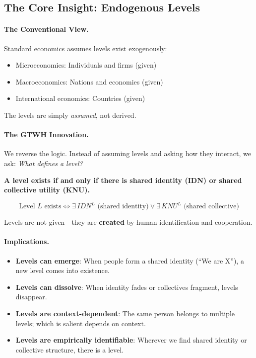 \subsection{The Core Insight: Endogenous Levels}

\paragraph{The Conventional View.}
Standard economics assumes levels exist exogenously:
\begin{itemize}
\item Microeconomics: Individuals and firms (given)
\item Macroeconomics: Nations and economies (given)
\item International economics: Countries (given)
\end{itemize}

The levels are simply \textit{assumed}, not derived.

\paragraph{The GTWH Innovation.}
We reverse the logic. Instead of assuming levels and asking how they interact, 
we ask: \textit{What defines a level?}

\begin{tcolorbox}[colback=blue!5!white, colframe=blue!75!black, title=The Endogeneity Principle]
\textbf{A level exists if and only if there is shared identity (IDN) or 
shared collective utility (KNU).}

\begin{equation}
\boxed{
\text{Level } L \text{ exists} \iff \exists \, IDN^L \text{ (shared identity)} \lor \exists \, KNU^L \text{ (shared collective)}
}
\end{equation}

Levels are not given---they are \textbf{created} by human identification and cooperation.
\end{tcolorbox}

\paragraph{Implications.}
\begin{itemize}
\item \textbf{Levels can emerge}: When people form a shared identity (``We are X''), 
a new level comes into existence.
\item \textbf{Levels can dissolve}: When identity fades or collectives fragment, 
levels disappear.
\item \textbf{Levels are context-dependent}: The same person belongs to multiple 
levels; which is salient depends on context.
\item \textbf{Levels are empirically identifiable}: Wherever we find shared 
identity or collective structure, there is a level.
\end{itemize}

